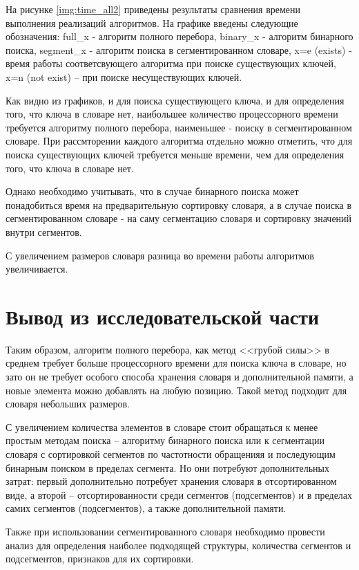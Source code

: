 На рисунке \ref{img:time_all2} приведены результаты сравнения времени выполнения реализаций алгоритмов. На графике введены следующие обозначения: full\_x - алгоритм полного перебора, binary\_x - алгоритм бинарного поиска, segment\_x - алгоритм поиска в сегментированном словаре, x=e (exists) - время работы соответсвующего алгоритма при поиске существующих ключей, x=n (not exist) -- при поиске несуществующих ключей.

\clearpage
{}

Как видно из графиков, и для поиска существующего ключа, и для определения того, что ключа в словаре нет, наибольшее количество процессорного времени требуется алгоритму полного перебора, наименьшее - поиску в сегментированном словаре. При рассмторении каждого алгоритма отдельно можно отметить, что для поиска существующих ключей требуется меньше времени, чем для определения того, что ключа в словаре нет.

Однако необходимо учитывать, что в случае бинарного поиска может понадобиться время на предварительную сортировку словаря, а в случае поиска в сегментированном словаре - на саму сегментацию словаря и сортировку значений внутри сегментов.

С увеличением размеров словаря разница во времени работы алгоритмов увеличивается.






\clearpage
\section{Вывод из исследовательской части}

Таким образом, алгоритм полного перебора, как метод <<грубой силы>> в среднем требует больше процессорного времени для поиска ключа в словаре, но зато он не требует особого способа хранения словаря и дополнительной памяти, а новые элемента можно добавлять на любую позицию. Такой метод подходит для словаря небольших размеров.

С увеличением количества элементов в словаре стоит обращаться к менее простым методам поиска -- алгоритму бинарного поиска или к сегментации словаря с сортировкой сегментов по частотности обращенияя и последующим бинарным поиском в пределах сегмента. Но они потребуют дополнительных затрат: первый дополнительно потребует  хранения словаря в отсортированном виде, а второй -- отсортированности среди сегментов (подсегментов) и в пределах самих сегментов (подсегментов), а также дополнительной памяти.

Также при использовании сегментированного словаря необходимо провести анализ для определения наиболее подходящей структуры, количества сегментов и подсегментов, признаков для их сортировки.